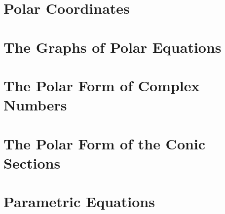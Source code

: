 \section{Polar Coordinates}



\newpage

\section{The Graphs of Polar Equations}



\newpage

\section{The Polar Form of Complex Numbers}



\newpage

\section{The Polar Form of the Conic Sections}



\newpage

\section{Parametric Equations}



\newpage